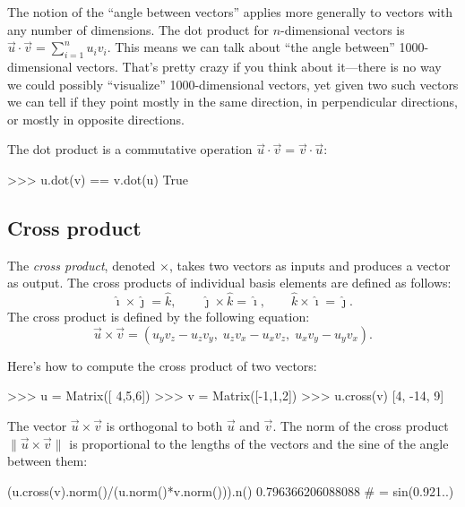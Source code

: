 The notion of the ``angle between vectors'' applies more generally to vectors with any number of dimensions.
The dot product for $n$-dimensional vectors is $\vec{u}\cdot\vec{v}=\sum_{i=1}^n u_iv_i$.
This means we can talk about ``the angle between'' 1000-dimensional vectors.
That's pretty crazy if you think about it---there is no way we could possibly ``visualize'' 1000-dimensional vectors,
yet given two such vectors we can tell if they point mostly in the same direction,
in perpendicular directions, or mostly in opposite directions. 

The dot product is a commutative operation $\vec{u}\cdot\vec{v} = \vec{v}\cdot\vec{u}$:



\small
\begin{verbatimtab}
>>> u.dot(v) == v.dot(u)
True
\end{verbatimtab}
\normalsize





\subsection{Cross product}
\label{vectors:cross_product}

The \emph{cross product}, denoted $\times$,															
takes two vectors as inputs and produces a vector as output.
The cross products of individual basis elements are defined as follows:
\[
 \hat{\imath}\times\hat{\jmath} =\hat{k}, \qquad
 \hat{\jmath}\times\hat{k} =\hat{\imath}, \qquad
 \hat{k}\times \hat{\imath}= \hat{\jmath}.
\]
The cross product is defined by the following equation:
\[
   \vec{u}\times\vec{v}=
   \left( 
     u_yv_z-u_zv_y, \; u_zv_x-u_xv_z, \; u_xv_y-u_yv_x 
    \right).
\]

\noindent
Here's how to compute the cross product of two vectors:
\small
\begin{verbatimtab}
>>> u = Matrix([ 4,5,6])
>>> v = Matrix([-1,1,2])
>>> u.cross(v)
[4, -14, 9]
\end{verbatimtab}
\normalsize

\noindent
The vector $\vec{u}\times \vec{v}$ is orthogonal to both $\vec{u}$ and $\vec{v}$.
The norm of the cross product  $\|\vec{u}\times \vec{v}\|$ is proportional to the lengths of the vectors
and the sine of the angle between them:
\small
\begin{verbatimtab}
(u.cross(v).norm()/(u.norm()*v.norm())).n()
0.796366206088088    # = sin(0.921..) 
\end{verbatimtab}
\normalsize

